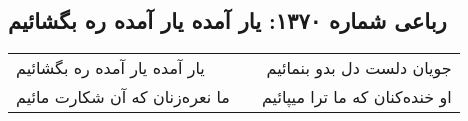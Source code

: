 \begin{center}
\section*{رباعی شماره ۱۳۷۰: یار آمده یار آمده ره بگشائیم}
\label{sec:1370}
\begin{longtable}{l p{0.5cm} r}
یار آمده یار آمده ره بگشائیم
&&
جویان دلست دل بدو بنمائیم
\\
ما نعره‌زنان که آن شکارت مائیم
&&
او خنده‌کنان که ما ترا میپائیم
\\
\end{longtable}
\end{center}

